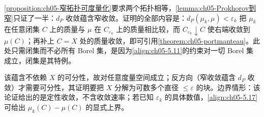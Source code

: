 \documentclass[../../main.tex]{subfiles}%
\begin{document}
\begin{remark}\label{remark:ch05-Prokhorov到窄动机}
\cref{proposition:ch05-窄拓扑可度量化}要求两个拓扑相等，\cref{lemma:ch05-Prokhorov到窄}只证了一半：$d_P$ 收敛蕴含窄收敛。证明的全部内容是：$d_P(\mu_k,\mu)<\varepsilon_k$ 把 $\mu_k$ 在任意闭集 $C$ 上的质量与 $\mu$ 在 $C_{\varepsilon_k}$ 上的质量相比较，而 $C_{\varepsilon_k}\downarrow C$ 使右端收敛到 $\mu(C)$；再补上 $C=X$ 处的质量收敛，即可引用\cref{theorem:ch05-portmanteau}。此处只需闭集而不必所有 Borel 集，是因为\eqref{align:ch05-5.11}的约束对一切 Borel 集成立，闭集是其特例。

该蕴含不依赖 $X$ 的可分性，故对任意度量空间成立；反方向（窄收敛蕴含 $d_P$ 收敛）才需要可分性，其证明要把 $X$ 分解为可数多个直径 $\leqslant\varepsilon$ 的块。边界情形：该论证给出的是定性收敛，不含收敛速率；若已知 $\varepsilon_k$ 的具体数值，\eqref{align:ch05-5.17}可给出 $\mu_k(C)-\mu(C)$ 的显式上界。
\end{remark}
\end{document}
